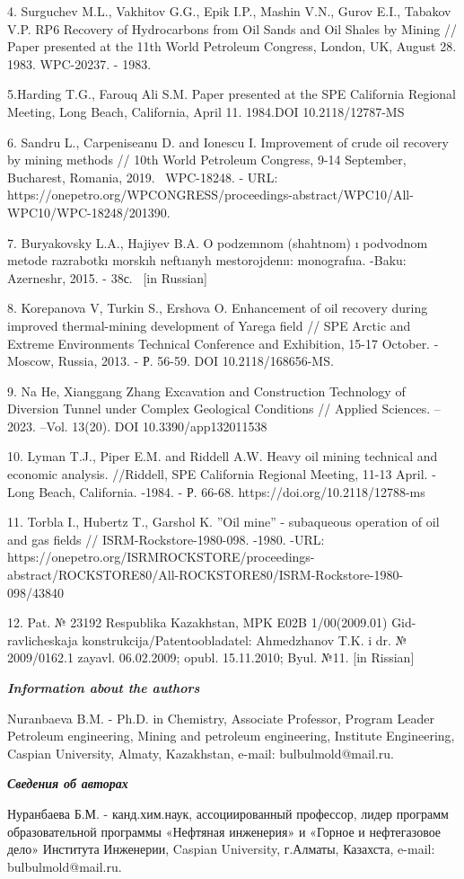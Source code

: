 4. Surguchev M.L., Vakhitov G.G., Epik I.P., Mashin V.N., Gurov E.I.,
Tabakov V.P. RP6 Recovery of Hydrocarbons from Oil Sands and Oil Shales
by Mining // Paper presented at the 11th World Petroleum Congress,
London, UK, August 28. 1983. WPC-20237. - 1983.

5.Harding T.G., Farouq Ali S.M. Paper presented at the SPE California
Regional Meeting, Long Beach, California, April 11. 1984.DOI
10.2118/12787-MS

6. Sandru L., Carpeniseanu D. and Ionescu I. Improvement of crude oil
recovery by mining methods // 10th World Petroleum Congress, 9-14
September, Bucharest, Romania, 2019. ~WPC-18248. - URL:
https://onepetro.org/WPCONGRESS/proceedings-abstract/WPC10/All-WPC10/WPC-18248/201390.

7. Buryakovsky L.A., Hajiyev B.A. O podzemnom (shahtnom) ı podvodnom
metode razrabotkı morskıh neftıanyh mestorojdenıı: monografııa. -Baku:
Azerneshr, 2015. - 38с. ~{[}in Russian{]}

8. Korepanova V, Turkin S., Ershova O. Enhancement of oil recovery
during improved thermal-mining development of Yarega field // SPE Arctic
and Extreme Environments Technical Conference and Exhibition, 15-17
October. - Moscow, Russia, 2013. - Р. 56-59. DOI 10.2118/168656-MS.

9. Na He, Xianggang Zhang Excavation and Construction Technology of
Diversion Tunnel under Complex Geological Conditions // Applied
Sciences. -- 2023. --Vol. 13(20). DOI 10.3390/app132011538

10. Lyman T.J., Piper E.M. and Riddell A.W. Heavy oil mining technical
and economic analysis. //Riddell, SPE California Regional Meeting, 11-13
April. - Long Beach, California. -1984. - Р. 66-68.
https://doi.org/10.2118/12788-ms

11. Torbla I., Hubertz T., Garshol K. ''Oil mine'' - subaqueous
operation of oil and gas fields // ISRM-Rockstore-1980-098. -1980. -URL:
https://onepetro.org/ISRMROCKSTORE/proceedings-abstract/ROCKSTORE80/All-ROCKSTORE80/ISRM-Rockstore-1980-098/43840

12. Pat. № 23192 Respublika Kazakhstan, MPK E02B 1/00(2009.01)
Gid-ravlicheskaja konstrukcija/Patentoobladatel\textquotesingle:
Ahmedzhanov T.K. i dr. № 2009/0162.1 zayavl. 06.02.2009; opubl.
15.11.2010; Byul. №11. {[}in Rissian{]}

\emph{{\bfseries Information about the authors}}

Nuranbaeva B.M. - Ph.D. in Chemistry, Associate Professor, Program
Leader Petroleum engineering, Mining and petroleum engineering,
Institute Engineering, Caspian University, Almaty, Kazakhstan, e-mail:
bulbulmold@mail.ru.

\emph{{\bfseries Сведения об авторах}}

Нуранбаева Б.М. - канд.хим.наук, ассоциированный профессор, лидер
программ образовательной программы «Нефтяная инженерия» и «Горное и
нефтегазовое дело» Института Инженерии, Caspian University, г.Алматы,
Казахста, e-mail: bulbulmold@mail.ru.

